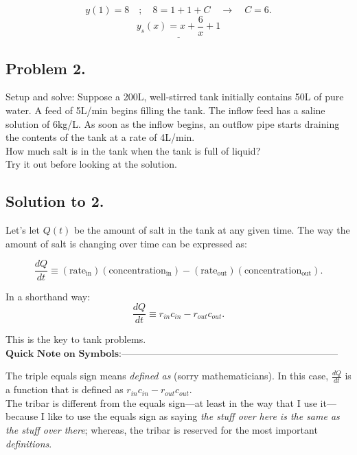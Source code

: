 \documentclass[a4paper,12pt]{article}
\begin{document}
$$ y(1)=8 \quad;\quad 8 = 1 + 1 + C \quad\rightarrow\quad C = 6. $$
$$ \underline{\boxed{y_s(x) = x + \frac{6}{x} + 1}} $$

\pagebreak

\subsection*{Problem 2.} 

Setup and solve: Suppose a 200L, well-stirred tank initially contains 50L of pure water. A feed of 5L/min begins filling the tank. The inflow feed has a saline solution of 6kg/L. As soon as the inflow begins, an outflow pipe starts draining the contents of the tank at a rate of 4L/min.\\

How much salt is in the tank when the tank is full of liquid?\\

Try it out before looking at the solution.

\pagebreak

\subsection*{Solution to 2.}

Let's let $Q(t)$ be the amount of salt in the tank at any given time. The way the amount of salt is changing over time can be expressed as:

$$ \frac{dQ}{dt} \equiv (\text{rate}_{\text{in}})(\text{concentration}_{\text{in}}) - (\text{rate}_{\text{out}})(\text{concentration}_{\text{out}}). $$

In a shorthand way:
\begin{equation}
	 \frac{dQ}{dt} \equiv r_{in}c_{in} - r_{out}c_{out}. \label{key_to_tank}
\end{equation}

This is the key to tank problems.\\

$\boxed{\textbf{Quick Note on Symbols:}}$--------------------------------------------------------------------

The triple equals sign means \textit{defined as} (sorry mathematicians). In this case, $\frac{dQ}{dt}$ is a function that is defined as $r_{in}c_{in} - r_{out}c_{out}$.\\

The tribar is different from the equals sign---at least in the way that I use it---because I like to use the equals sign as saying \textit{the stuff over here is the same as the stuff over there}; whereas, the tribar is reserved for the most important \textit{definitions}.\\
\end{document}
